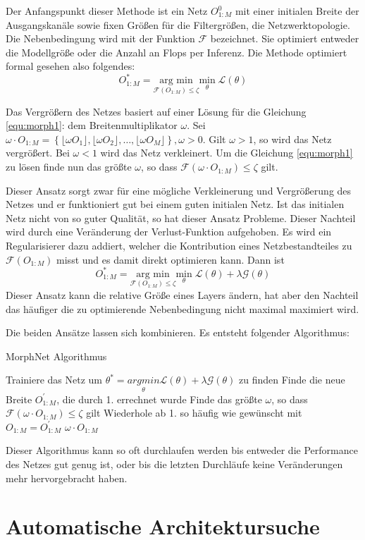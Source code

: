 Der Anfangspunkt dieser Methode ist ein Netz $O_{1:M}^0$ mit einer initialen Breite der Ausgangskanäle sowie fixen Größen für die Filtergrößen, die Netzwerktopologie. Die Nebenbedingung wird mit der Funktion $\mathcal{F}$ bezeichnet. Sie optimiert entweder die Modellgröße oder die Anzahl an Flops per Inferenz. Die Methode optimiert formal gesehen also folgendes:
\begin{equation}
 O^{\ast}_{1:M}= \underset{\mathcal{F}(O_{1:M})\leq \zeta}{\text{arg min}} \underset{\theta}{\text{min}}\; \mathcal{L}(\theta)\label{equ:morph1}
\end{equation}

Das Vergrößern des Netzes basiert auf einer Lösung für die Gleichung \ref{equ:morph1}: dem Breitenmultiplikator $\omega$. 
Sei $\omega \cdot O_{1:M} = \left\{ \lfloor \omega O_1 \rfloor, \lfloor \omega O_2 \rfloor, \ldots , \lfloor \omega O_M \rfloor \right\}, \omega>0$. Gilt $\omega>1$, so wird das Netz vergrößert. Bei $\omega <1$ wird das Netz verkleinert. Um die Gleichung \ref{equ:morph1} zu lösen finde nun das größte $\omega$, so dass $\mathcal{F}(\omega \cdot O_{1:M})\leq \zeta$ gilt. 

Dieser Ansatz sorgt zwar für eine mögliche Verkleinerung und Vergrößerung des Netzes und er funktioniert gut bei einem guten initialen Netz. Ist das initialen Netz nicht von so guter Qualität, so hat dieser Ansatz Probleme. 
Dieser Nachteil wird durch eine Veränderung der Verlust-Funktion aufgehoben. Es wird ein Regularisierer dazu addiert, welcher die Kontribution eines Netzbestandteiles zu $\mathcal{F}( O_{1:M})$ misst und es damit direkt optimieren kann. Dann ist
\begin{equation}
 O^{\ast}_{1:M}= \underset{\mathcal{F}(O_{1:M})\leq \zeta}{\text{arg min}} \underset{\theta}{\text{min}}\; \mathcal{L}(\theta) + \lambda \mathcal{G}(\theta)  
 \label{equ:morph2}
\end{equation}
Dieser Ansatz kann die relative Größe eines Layers ändern, hat aber den Nachteil das häufiger die zu optimierende Nebenbedingung nicht maximal maximiert wird.


Die beiden Ansätze lassen sich kombinieren. Es entsteht folgender Algorithmus:
\begin{algorithm}[H]
\caption{MorphNet Algorithmus}
\begin{algorithmic}[1]
\STATE Trainiere das Netz um $\theta^{\ast}=\underset{\theta}{arg min} \mathcal{L}(\theta) + \lambda \mathcal{G}(\theta)$ zu finden
\STATE Finde die neue Breite $O_{1:M}^{\prime}$, die durch 1. errechnet wurde
\STATE Finde das größte $\omega$, so dass $\mathcal{F}(\omega \cdot O_{1:M})\leq \zeta$ gilt
\STATE Wiederhole ab 1. so häufig wie gewünscht mit $O_{1:M} = O_{1:M}^{\prime}$
\ENSURE $\omega \cdot O_{1:M}$
\end{algorithmic}
\label{alg:morphnet}
\end{algorithm}
Dieser Algorithmus kann so oft durchlaufen werden bis entweder die Performance des Netzes gut genug ist, oder bis die letzten Durchläufe keine Veränderungen mehr hervorgebracht haben. 

\section{Automatische Architektursuche}
\color{black}
